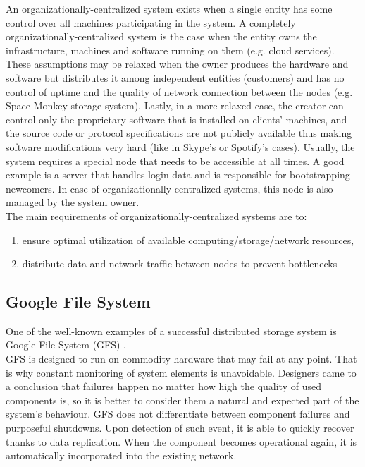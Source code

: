 \documentclass{pracamgren}
\begin{document}
An organizationally-centralized system exists when a single entity has some control over all machines participating in the system. A completely organizationally-centralized system is the case when the entity owns the infrastructure, machines and software running on them (e.g. cloud services). These assumptions may be relaxed when the owner produces the hardware and software but distributes it among independent entities (customers) and has no control of uptime and the quality of network connection between the nodes (e.g. Space Monkey \cite{space_monkey} storage system). Lastly, in a more relaxed case, the creator can control only the proprietary software that is installed on clients' machines, and the source code or protocol specifications are not publicly available thus making software modifications very hard (like in Skype's \cite{skype} or Spotify's \cite{spotify} cases). Usually, the system requires a special node that needs to be accessible at all times. A good example is a server that handles login data and is responsible for bootstrapping newcomers. In case of organizationally-centralized systems, this node is also managed by the system owner.\\

The main requirements of organizationally-centralized systems are to:
\begin{enumerate}
  \item ensure optimal utilization of available computing/storage/network resources,
  \item distribute data and network traffic between nodes to prevent bottlenecks
\end{enumerate}

\subsection{Google File System}

One of the well-known examples of a successful distributed storage system is Google File System (GFS) \cite{gfs}.\\

GFS is designed to run on commodity hardware that may fail at any point. That is why constant monitoring of system elements is unavoidable. Designers came to a conclusion that failures happen no matter how high the quality of used components is, so it is better to consider them a natural and expected part of the system's behaviour. GFS does not differentiate between component failures and purposeful shutdowns. Upon detection of such event, it is able to quickly recover thanks to data replication. When the component becomes operational again, it is automatically incorporated into the existing network.\\
\end{document}
